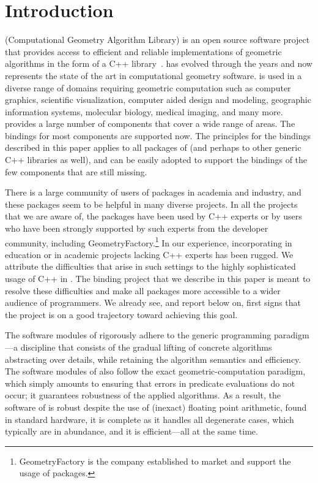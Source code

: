 \section{Introduction}
\label{sec:intro}
\cgal{} (Computational Geometry Algorithm Library) is an open source
software project that provides access to efficient and reliable
implementations of geometric algorithms in the form of a C++
library~\cite{cgal:eb-21a}. \cgal{} has evolved through the years and
now represents the state of the art in computational geometry software. 
\cgal{} is used in a diverse range of domains requiring geometric 
computation such as computer graphics, scientific visualization, 
computer aided design and modeling, geographic information systems,
molecular biology, medical imaging, and many more. \cgal{} provides
a large number of components that cover a wide range of areas. The 
bindings for most components are supported now. The principles for the 
bindings described in this paper applies to all packages of \cgal{}
(and perhaps to other generic C++ libraries as well), and can be easily
adopted to support the bindings of the few components that are still 
missing.

There is a large community of users of \cgal{} 
packages in academia and industry, and these packages seem to be
helpful in many diverse projects. In all the projects that we are
aware of, the packages have been used by C++ experts or by users who
have been strongly supported by such experts from the \cgal{}
developer community, including
GeometryFactory.\footnote{GeometryFactory is the company established
  to market and support the usage of \cgal{} packages.} In our
experience, incorporating \cgal{} in education or in academic projects
lacking C++ experts has been rugged. We attribute the difficulties
that arise in such settings to the highly sophisticated usage of C++
in \cgal. The binding project that we describe in this paper is meant
to resolve these difficulties and make all \cgal{} packages more
accessible to a wider audience of programmers. We already see, and
report below on, first signs that the project is on a good trajectory
toward achieving this goal.

The software modules of \cgal{} rigorously adhere to the
generic programming paradigm---a discipline that consists of the
gradual lifting of concrete algorithms abstracting over details, while
retaining the algorithm semantics and efficiency. The software modules
of \cgal{} also follow the exact geometric-computation paradigm, which
simply amounts to ensuring that errors in predicate evaluations do not
occur; it guarantees robustness of the applied algorithms.  As a
result, the software of \cgal{} is robust despite the use of (inexact)
floating point arithmetic, found in standard hardware, it is complete
as it handles all degenerate cases, which typically are in abundance,
and it is efficient---all at the same time.

